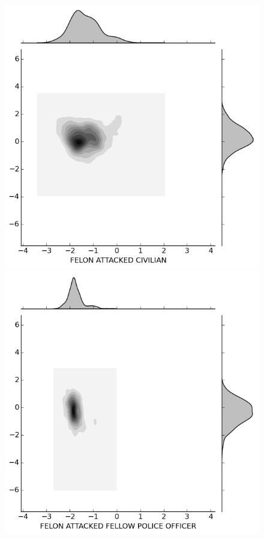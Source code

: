 \begin{figure}[H]
  \centering
  \begin{minipage}[b]{0.30\linewidth}
    \includegraphics[width=\linewidth]{images/subcircum/FELON_ATTACKED_CIVILIAN.png}
  \end{minipage}
  \quad
  \begin{minipage}[b]{0.30\linewidth}
    \includegraphics[width=\linewidth]{images/subcircum/FELON_ATTACKED_FELLOW_POLICE_OFFICER.png}

\end{minipage}
\end{figure}
